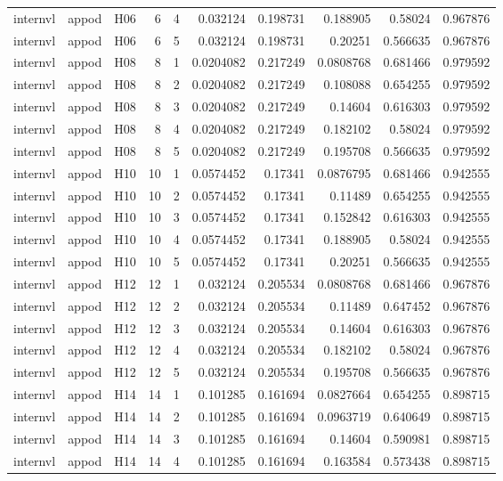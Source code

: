 \begin{longtable}{lllrrrrrrr}
internvl & appod & H06 & 6 & 4 & 0.032124 & 0.198731 & 0.188905 & 0.58024 & 0.967876 \\
internvl & appod & H06 & 6 & 5 & 0.032124 & 0.198731 & 0.20251 & 0.566635 & 0.967876 \\
internvl & appod & H08 & 8 & 1 & 0.0204082 & 0.217249 & 0.0808768 & 0.681466 & 0.979592 \\
internvl & appod & H08 & 8 & 2 & 0.0204082 & 0.217249 & 0.108088 & 0.654255 & 0.979592 \\
internvl & appod & H08 & 8 & 3 & 0.0204082 & 0.217249 & 0.14604 & 0.616303 & 0.979592 \\
internvl & appod & H08 & 8 & 4 & 0.0204082 & 0.217249 & 0.182102 & 0.58024 & 0.979592 \\
internvl & appod & H08 & 8 & 5 & 0.0204082 & 0.217249 & 0.195708 & 0.566635 & 0.979592 \\
internvl & appod & H10 & 10 & 1 & 0.0574452 & 0.17341 & 0.0876795 & 0.681466 & 0.942555 \\
internvl & appod & H10 & 10 & 2 & 0.0574452 & 0.17341 & 0.11489 & 0.654255 & 0.942555 \\
internvl & appod & H10 & 10 & 3 & 0.0574452 & 0.17341 & 0.152842 & 0.616303 & 0.942555 \\
internvl & appod & H10 & 10 & 4 & 0.0574452 & 0.17341 & 0.188905 & 0.58024 & 0.942555 \\
internvl & appod & H10 & 10 & 5 & 0.0574452 & 0.17341 & 0.20251 & 0.566635 & 0.942555 \\
internvl & appod & H12 & 12 & 1 & 0.032124 & 0.205534 & 0.0808768 & 0.681466 & 0.967876 \\
internvl & appod & H12 & 12 & 2 & 0.032124 & 0.205534 & 0.11489 & 0.647452 & 0.967876 \\
internvl & appod & H12 & 12 & 3 & 0.032124 & 0.205534 & 0.14604 & 0.616303 & 0.967876 \\
internvl & appod & H12 & 12 & 4 & 0.032124 & 0.205534 & 0.182102 & 0.58024 & 0.967876 \\
internvl & appod & H12 & 12 & 5 & 0.032124 & 0.205534 & 0.195708 & 0.566635 & 0.967876 \\
internvl & appod & H14 & 14 & 1 & 0.101285 & 0.161694 & 0.0827664 & 0.654255 & 0.898715 \\
internvl & appod & H14 & 14 & 2 & 0.101285 & 0.161694 & 0.0963719 & 0.640649 & 0.898715 \\
internvl & appod & H14 & 14 & 3 & 0.101285 & 0.161694 & 0.14604 & 0.590981 & 0.898715 \\
internvl & appod & H14 & 14 & 4 & 0.101285 & 0.161694 & 0.163584 & 0.573438 & 0.898715 \\

\end{longtable}

